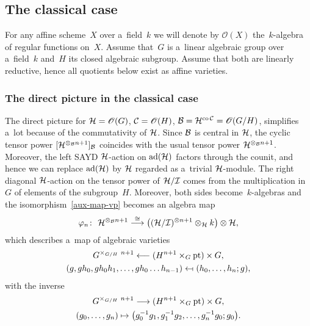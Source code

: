 \documentclass[pdftex]{sigma}
\numberwithin{equation}{section}
\DeclareMathOperator{\ad}{ad}
\DeclareMathOperator{\co}{co}
\begin{document}
\subsection{The classical case}

For any af\/f\/ine scheme~$X$ over a~f\/ield~$k$ we will denote by $\mathscr{O}(X)$ the~$k$-algebra of regular functions on~$X$.
Assume that~$G$ is a~linear algebraic group over a~f\/ield~$k$ and~$H$ its closed algebraic subgroup.
Assume that both are linearly reductive, hence all quotients below exist as af\/f\/ine varieties.

\subsubsection{The direct picture in the classical case}

The direct picture for ${\cal H}=\mathscr{O}(G)$, ${\cal C}=\mathscr{O}(H)$, ${\cal B}={\cal H}^{\co{\cal C}}=\mathscr{O}(G/H)$,
simplif\/ies a~lot because of the commutativity of ${\cal H}$.
Since ${\cal B}$ is central in ${\cal H}$, the cyclic tensor power $[{\cal H}^{\otimes_{{\cal B}} n+1}]_{{\cal B}}$
coincides with the usual tensor power ${\cal H}^{\otimes_{{\cal B}} n+1}$.
Moreover, the left SAYD ${\cal H}$-action on $\ad({\cal H})$ factors through the counit, and hence we can replace
$\ad({\cal H})$ by ${\cal H}$ regarded as a~trivial ${\cal H}$-module.
The right diagonal ${\cal H}$-action on the tensor power of ${\cal H}/{\cal I}$ comes from the multiplication in~$G$ of
elements of the subgroup~$H$.
Moreover, both sides become~$k$-algebras and the isomorphism~\eqref{aux-map-vp} becomes an algebra map
\begin{gather*}%
\varphi_n\colon \  {\cal H}^{\otimes_{\cal B} n+1} \stackrel{\cong}{\longrightarrow} \big(({\cal H}/{\cal I})^{\otimes n+1}
\otimes_{\cal H} k\big)\otimes {\cal H},
\end{gather*}
which describes a~map of algebraic varieties
\begin{gather}
G^{\times_{G/H}\ n+1}\longleftarrow (H^{n+1}\times_{G}{\rm pt})\times G,
\nonumber
\\
(g, gh_{0}, gh_{0}h_{1},\ldots, gh_{0}\dots h_{n-1})\leftarrow\hspace{-0.18em}\shortmid (h_{0}, \ldots, h_{n}; g),
\label{str-pic-var-phi}
\end{gather}
with the inverse
\begin{gather}
G^{\times_{G/H}\ n+1}\longrightarrow (H^{n+1}\times_{G}{\rm pt})\times G,
\nonumber
\\
(g_{0}, \ldots, g_{n})\mapsto \big(g_{0}^{-1}g_{1}, g_{1}^{-1}g_{2}, \ldots, g_{n}^{-1}g_{0}; g_{0}\big).
\label{str-pic-var-psi}
\end{gather}
\end{document}
